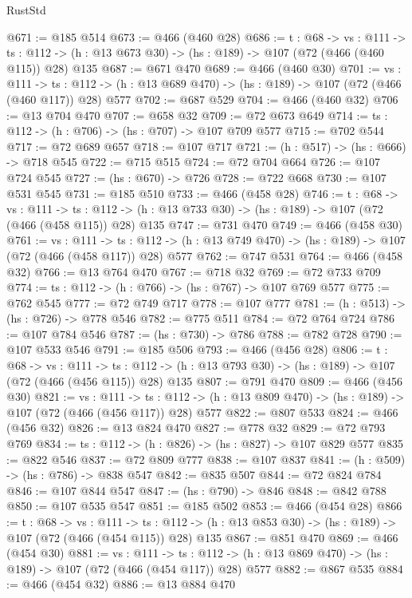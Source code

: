 \begin{lexlean}{RustStd}
\begin{coremodule}
{\begin{coremodule}
{{{{@671 := @185 @514
@673 := @466 (@460 @28)
@686 := {t : @68} ->
  {vs : @111} ->
  {ts : @112} -> (h : @13 @673 @30) -> (hs : @189) -> @107 (@72 (@466 (@460 @115)) @28) @135
@687 := @671 @470
@689 := @466 (@460 @30)
@701 := {vs : @111} ->
  {ts : @112} -> (h : @13 @689 @470) -> (hs : @189) -> @107 (@72 (@466 (@460 @117)) @28) @577
@702 := @687 @529
@704 := @466 (@460 @32)
@706 := @13 @704 @470
@707 := @658 @32
@709 := @72 @673 @649
@714 := {ts : @112} -> (h : @706) -> (hs : @707) -> @107 @709 @577
@715 := @702 @544
@717 := @72 @689 @657
@718 := @107 @717
@721 := (h : @517) -> (hs : @666) -> @718 @545
@722 := @715 @515
@724 := @72 @704 @664
@726 := @107 @724 @545
@727 := (hs : @670) -> @726
@728 := @722 @668
@730 := @107 @531 @545
@731 := @185 @510
@733 := @466 (@458 @28)
@746 := {t : @68} ->
  {vs : @111} ->
  {ts : @112} -> (h : @13 @733 @30) -> (hs : @189) -> @107 (@72 (@466 (@458 @115)) @28) @135
@747 := @731 @470
@749 := @466 (@458 @30)
@761 := {vs : @111} ->
  {ts : @112} -> (h : @13 @749 @470) -> (hs : @189) -> @107 (@72 (@466 (@458 @117)) @28) @577
@762 := @747 @531
@764 := @466 (@458 @32)
@766 := @13 @764 @470
@767 := @718 @32
@769 := @72 @733 @709
@774 := {ts : @112} -> (h : @766) -> (hs : @767) -> @107 @769 @577
@775 := @762 @545
@777 := @72 @749 @717
@778 := @107 @777
@781 := (h : @513) -> (hs : @726) -> @778 @546
@782 := @775 @511
@784 := @72 @764 @724
@786 := @107 @784 @546
@787 := (hs : @730) -> @786
@788 := @782 @728
@790 := @107 @533 @546
@791 := @185 @506
@793 := @466 (@456 @28)
@806 := {t : @68} ->
  {vs : @111} ->
  {ts : @112} -> (h : @13 @793 @30) -> (hs : @189) -> @107 (@72 (@466 (@456 @115)) @28) @135
@807 := @791 @470
@809 := @466 (@456 @30)
@821 := {vs : @111} ->
  {ts : @112} -> (h : @13 @809 @470) -> (hs : @189) -> @107 (@72 (@466 (@456 @117)) @28) @577
@822 := @807 @533
@824 := @466 (@456 @32)
@826 := @13 @824 @470
@827 := @778 @32
@829 := @72 @793 @769
@834 := {ts : @112} -> (h : @826) -> (hs : @827) -> @107 @829 @577
@835 := @822 @546
@837 := @72 @809 @777
@838 := @107 @837
@841 := (h : @509) -> (hs : @786) -> @838 @547
@842 := @835 @507
@844 := @72 @824 @784
@846 := @107 @844 @547
@847 := (hs : @790) -> @846
@848 := @842 @788
@850 := @107 @535 @547
@851 := @185 @502
@853 := @466 (@454 @28)
@866 := {t : @68} ->
  {vs : @111} ->
  {ts : @112} -> (h : @13 @853 @30) -> (hs : @189) -> @107 (@72 (@466 (@454 @115)) @28) @135
@867 := @851 @470
@869 := @466 (@454 @30)
@881 := {vs : @111} ->
  {ts : @112} -> (h : @13 @869 @470) -> (hs : @189) -> @107 (@72 (@466 (@454 @117)) @28) @577
@882 := @867 @535
@884 := @466 (@454 @32)
@886 := @13 @884 @470
}}}}
\end{coremodule}}
\end{coremodule}
\end{lexlean}

